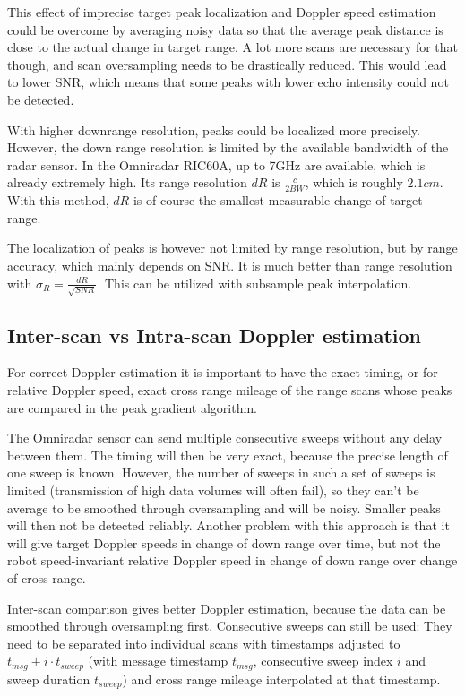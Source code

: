 This effect of imprecise target peak localization and Doppler speed
estimation could be overcome by averaging noisy data so that the average
peak distance is close to the actual change in target range. A lot more
scans are necessary for that though, and scan oversampling needs to be
drastically reduced. This would lead to lower SNR, which means that some
peaks with lower echo intensity could not be detected.

With higher downrange resolution, peaks could be localized more
precisely. However, the down range resolution is limited by the
available bandwidth of the radar sensor. In the Omniradar RIC60A, up to
7GHz are available, which is already extremely high. Its range
resolution \(dR\) is \(\frac{c}{2 BW}\), which is roughly \(2.1cm\). With
this method, \(dR\) is of course the smallest measurable change of
target range.

The localization of peaks is however not limited by range resolution,
but by range accuracy, which mainly depends on SNR. It is much better
than range resolution with \(\sigma_R = \frac{dR}{\sqrt{SNR}}\). This
can be utilized with subsample peak interpolation.

\subsection{Inter-scan vs Intra-scan Doppler estimation}\label{inter-scan-vs-intra-scan-doppler-estimation}

For correct Doppler estimation it is important to have the exact timing,
or for relative Doppler speed, exact cross range mileage of the range
scans whose peaks are compared in the peak gradient algorithm.

The Omniradar sensor can send multiple consecutive sweeps without any
delay between them. The timing will then be very exact, because the
precise length of one sweep is known. However, the number of sweeps in
such a set of sweeps is limited (transmission of high data volumes will
often fail), so they can't be average to be smoothed through
oversampling and will be noisy. Smaller peaks will then not be detected
reliably. Another problem with this approach is that it will give target
Doppler speeds in change of down range over time, but not the robot
speed-invariant relative Doppler speed in change of down range over
change of cross range.

Inter-scan comparison gives better Doppler estimation, because the data
can be smoothed through oversampling first. Consecutive sweeps can still
be used: They need to be separated into individual scans with timestamps
adjusted to \(t_{msg} + i\cdot t_{sweep}\) (with message timestamp
\(t_{msg}\), consecutive sweep index \(i\) and sweep duration
\(t_{sweep}\)) and cross range mileage interpolated at that timestamp.

